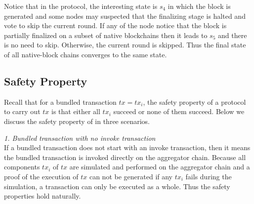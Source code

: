 Notice that in the protocol, the interesting state is $s_4$ in which the block is generated and some nodes may suspected that the finalizing stage is halted and vote to skip the current round. If any of the node notice that the block is partially finalized on a subset of native blockchains then it leads to $s_5$ and there is no need to skip. Otherwise, the current round is skipped. Thus the final state of all native-block chains converges to the same state.

\subsection{Safety Property}
Recall that for a bundled transaction $tx = {tx_i}$, the safety property of a protocol to carry out $tx$ is that either all $tx_i$ succeed or none of them succeed. Below we discuss the safety property of \dprotocol in three scenarios.



\smallskip\noindent\emph{1. Bundled transaction with no invoke transaction}\\
If a bundled transaction does not start with an invoke transaction, then it means the bundled transaction is invoked directly on the aggregator chain. Because all components $tx_i$ of $tx$ are simulated and performed on the aggregator chain and a proof of the execution of $tx$ can not be generated if any $tx_i$ fails during the simulation, a transaction can only be executed as a whole. Thus the safety properties hold naturally.



